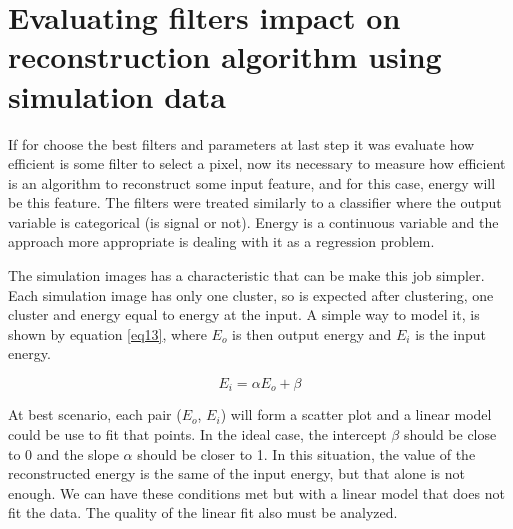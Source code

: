 \documentclass[
        oneside,      %
        english,			
        brazil			 
        ]{abntbibufjf}
\begin{document}






\section{Evaluating filters impact on reconstruction algorithm using simulation data}

If for choose the best filters and parameters at last step it was evaluate how efficient is some filter to select a pixel, now its necessary to measure how efficient is an algorithm to reconstruct some input feature, and for this case, energy will be this feature. The filters were treated similarly to a classifier where the output variable is categorical (is signal or not). Energy is a continuous variable and the approach more appropriate is dealing with it as a regression problem.

The simulation images has a characteristic that can be make this job simpler. Each simulation image has only one cluster, so is expected after clustering, one cluster and energy equal to energy at the input. A simple way to model it, is shown by equation \ref{eq13}, where $E_{o}$ is then output energy and $E_{i}$ is the input energy.

\begin{equation}
    E_{i} = \alpha E_{o} + \beta
    \label{eq13}
\end{equation}

At best scenario, each pair ($E_{o}$, $E_{i}$) will form a scatter plot and a linear model could be use to fit that points. In the ideal case, the intercept $\beta$ should be close to 0 and the slope $\alpha$ should be closer to 1. In this situation, the value of the reconstructed energy is the same of the input energy, but that alone is not enough. We can have these conditions met but with a linear model that does not fit the data. The quality of the linear fit also must be analyzed.
\end{document}
